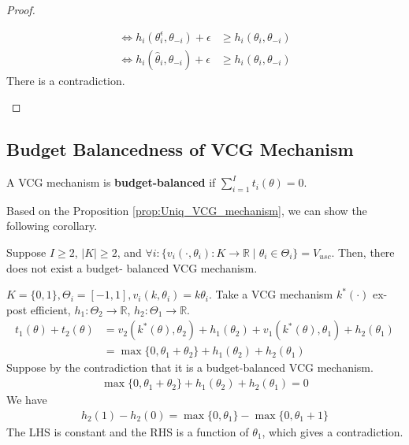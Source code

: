 \documentclass[11pt]{elegantbook_2}
\begin{document}
\begin{proof}
\begin{enumerate}
\begin{enumerate}[$\circ$]
\begin{equation}
\begin{aligned}
                    \Leftrightarrow h_i(\theta^\epsilon_i,\theta_{-i})+\epsilon&\geq h_i(\theta_i,\theta_{-i})\\
                    \Leftrightarrow h_i(\hat{\theta}_i,\theta_{-i})+\epsilon&\geq h_i(\theta_i,\theta_{-i})
                \end{aligned}
                \nonumber
            \end{equation}
            There is a contradiction.
        \end{enumerate}
    \end{enumerate}
\end{proof}


\subsection{Budget Balancedness of VCG Mechanism}
\begin{definition}
    A VCG mechanism is \textbf{budget-balanced} if $\sum_{i=1}^It_i(\theta)=0$.
\end{definition}

Based on the Proposition \ref{prop:Uniq_VCG_mechanism}, we can show the following corollary.
\begin{corollary}
    Suppose $I\geq 2$, $|K|\geq 2$, and $\forall i: \{v_i(\cdot,\theta_i): K \rightarrow \mathbb{R}\mid \theta_i\in\Theta_i\}=V_{usc}$. Then, there does not exist a budget-
    balanced VCG mechanism.
\end{corollary}


\begin{example}
    $K=\{0,1\},\Theta_i=[-1,1], v_i(k,\theta_i)=k\theta_i$. Take a VCG mechanism $k^*(\cdot)$ ex-post efficient, $h_1:\Theta_2 \rightarrow \mathbb{R}$, $h_2:\Theta_1 \rightarrow \mathbb{R}$.
    \begin{equation}
        \begin{aligned}
            t_1(\theta)+t_2(\theta)&=v_2(k^*(\theta),\theta_2)+h_1(\theta_2)+v_1(k^*(\theta),\theta_1)+h_2(\theta_1)\\
            &=\max\{0,\theta_1+\theta_2\}+h_1(\theta_2)+h_2(\theta_1)
        \end{aligned}
        \nonumber
    \end{equation}
    Suppose by the contradiction that it is a budget-balanced VCG mechanism.
    \begin{equation}
        \begin{aligned}
            \max\{0,\theta_1+\theta_2\}+h_1(\theta_2)+h_2(\theta_1)=0
        \end{aligned}
        \nonumber
    \end{equation}
    We have
    \begin{equation}
        \begin{aligned}
            h_2(1)-h_2(0)=\max\{0,\theta_1\}-\max\{0,\theta_1+1\}
        \end{aligned}
        \nonumber
    \end{equation}
    The LHS is constant and the RHS is a function of $\theta_1$, which gives a contradiction.
\end{example}
\end{document}
